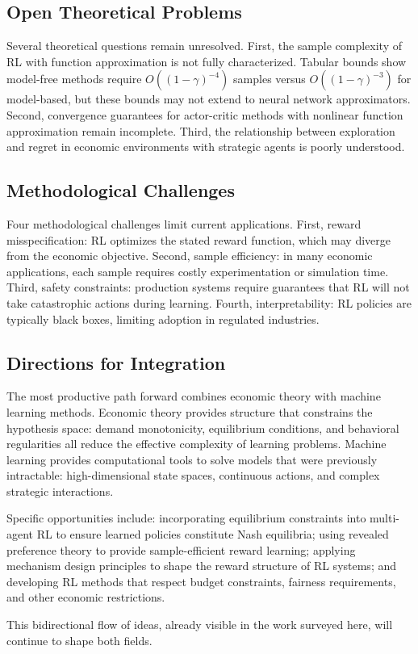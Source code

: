 \subsection*{Open Theoretical Problems}

Several theoretical questions remain unresolved. First, the sample complexity of RL with function approximation is not fully characterized. Tabular bounds show model-free methods require $O((1-\gamma)^{-4})$ samples versus $O((1-\gamma)^{-3})$ for model-based, but these bounds may not extend to neural network approximators. Second, convergence guarantees for actor-critic methods with nonlinear function approximation remain incomplete. Third, the relationship between exploration and regret in economic environments with strategic agents is poorly understood.

\subsection*{Methodological Challenges}

Four methodological challenges limit current applications. First, reward misspecification: RL optimizes the stated reward function, which may diverge from the economic objective. Second, sample efficiency: in many economic applications, each sample requires costly experimentation or simulation time. Third, safety constraints: production systems require guarantees that RL will not take catastrophic actions during learning. Fourth, interpretability: RL policies are typically black boxes, limiting adoption in regulated industries.

\subsection*{Directions for Integration}

The most productive path forward combines economic theory with machine learning methods. Economic theory provides structure that constrains the hypothesis space: demand monotonicity, equilibrium conditions, and behavioral regularities all reduce the effective complexity of learning problems. Machine learning provides computational tools to solve models that were previously intractable: high-dimensional state spaces, continuous actions, and complex strategic interactions.

Specific opportunities include: incorporating equilibrium constraints into multi-agent RL to ensure learned policies constitute Nash equilibria; using revealed preference theory to provide sample-efficient reward learning; applying mechanism design principles to shape the reward structure of RL systems; and developing RL methods that respect budget constraints, fairness requirements, and other economic restrictions.

This bidirectional flow of ideas, already visible in the work surveyed here, will continue to shape both fields.
